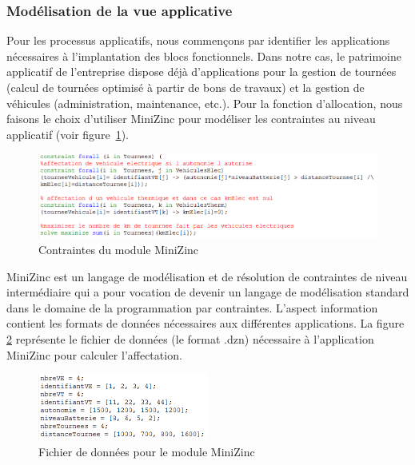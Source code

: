 

\subsubsection{Modélisation de la vue applicative}

Pour les processus applicatifs, nous commençons par identifier  les applications
nécessaires à l'implantation des blocs fonctionnels. Dans notre cas, le
patrimoine applicatif de l'entreprise dispose déjà d'applications pour la
gestion de tournées (calcul de tournées optimisé à partir de bons de travaux) et
la gestion de véhicules (administration, maintenance, etc.). Pour la fonction
d'allocation, nous faisons le choix d'utiliser MiniZinc pour modéliser les
contraintes au niveau applicatif (voir figure~\ref{fig:contraintesMiniZinc}).

\begin{figure}[!htbp]
  \centering
  \includegraphics[width=1\textwidth]{figures/5_implementation/module_minizinc.png}
 \caption{Contraintes du module MiniZinc}
 \label{fig:contraintesMiniZinc}
\end{figure} 

MiniZinc est un langage de modélisation et de résolution de contraintes de
niveau intermédiaire qui a pour vocation de devenir un langage de modélisation
standard dans le domaine de la programmation par contraintes. L'aspect
information contient les formats de données nécessaires aux différentes
applications. La figure \ref{fig:formatMiniZinc} représente le fichier de
données (le format .dzn) nécessaire à l'application MiniZinc pour calculer
l'affectation.

\begin{figure}[!htbp]
 \begin{center}
  \includegraphics[width=0.5\textwidth]{figures/5_implementation/format_minizinc.png}
 \end{center}
 \caption{Fichier de données pour le module MiniZinc}
 \label{fig:formatMiniZinc}
\end{figure} 

